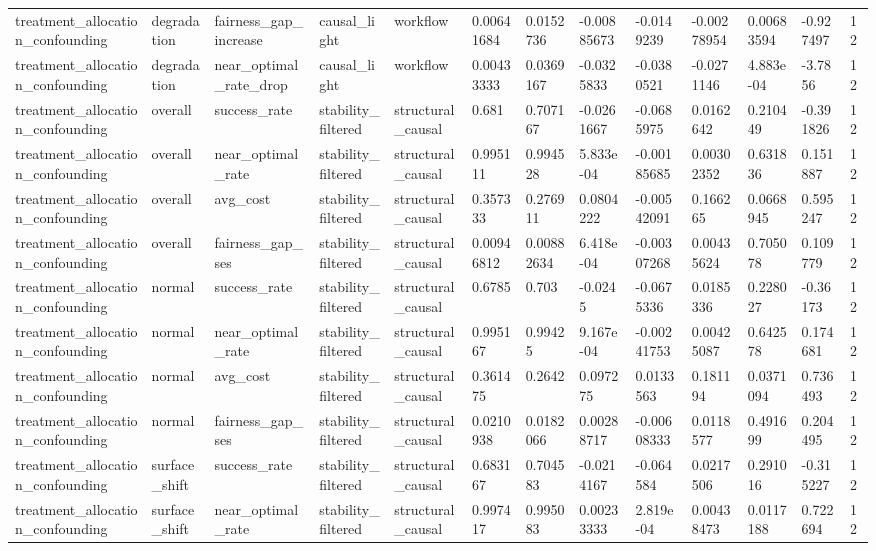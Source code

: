 \begin{tabular}{lllllllllllll}
treatment\_allocation\_confounding & degradation & fairness\_gap\_increase & causal\_light & workflow & 0.00641684 & 0.0152736 & -0.00885673 & -0.0149239 & -0.00278954 & 0.00683594 & -0.927497 & 12 \\
treatment\_allocation\_confounding & degradation & near\_optimal\_rate\_drop & causal\_light & workflow & 0.00433333 & 0.0369167 & -0.0325833 & -0.0380521 & -0.0271146 & 4.883e-04 & -3.7856 & 12 \\
treatment\_allocation\_confounding & overall & success\_rate & stability\_filtered & structural\_causal & 0.681 & 0.707167 & -0.0261667 & -0.0685975 & 0.0162642 & 0.210449 & -0.391826 & 12 \\
treatment\_allocation\_confounding & overall & near\_optimal\_rate & stability\_filtered & structural\_causal & 0.995111 & 0.994528 & 5.833e-04 & -0.00185685 & 0.00302352 & 0.631836 & 0.151887 & 12 \\
treatment\_allocation\_confounding & overall & avg\_cost & stability\_filtered & structural\_causal & 0.357333 & 0.276911 & 0.0804222 & -0.00542091 & 0.166265 & 0.0668945 & 0.595247 & 12 \\
treatment\_allocation\_confounding & overall & fairness\_gap\_ses & stability\_filtered & structural\_causal & 0.00946812 & 0.00882634 & 6.418e-04 & -0.00307268 & 0.00435624 & 0.705078 & 0.109779 & 12 \\
treatment\_allocation\_confounding & normal & success\_rate & stability\_filtered & structural\_causal & 0.6785 & 0.703 & -0.0245 & -0.0675336 & 0.0185336 & 0.228027 & -0.36173 & 12 \\
treatment\_allocation\_confounding & normal & near\_optimal\_rate & stability\_filtered & structural\_causal & 0.995167 & 0.99425 & 9.167e-04 & -0.00241753 & 0.00425087 & 0.642578 & 0.174681 & 12 \\
treatment\_allocation\_confounding & normal & avg\_cost & stability\_filtered & structural\_causal & 0.361475 & 0.2642 & 0.097275 & 0.0133563 & 0.181194 & 0.0371094 & 0.736493 & 12 \\
treatment\_allocation\_confounding & normal & fairness\_gap\_ses & stability\_filtered & structural\_causal & 0.0210938 & 0.0182066 & 0.00288717 & -0.00608333 & 0.0118577 & 0.491699 & 0.204495 & 12 \\
treatment\_allocation\_confounding & surface\_shift & success\_rate & stability\_filtered & structural\_causal & 0.683167 & 0.704583 & -0.0214167 & -0.064584 & 0.0217506 & 0.291016 & -0.315227 & 12 \\
treatment\_allocation\_confounding & surface\_shift & near\_optimal\_rate & stability\_filtered & structural\_causal & 0.997417 & 0.995083 & 0.00233333 & 2.819e-04 & 0.00438473 & 0.0117188 & 0.722694 & 12 \\

\end{tabular}
